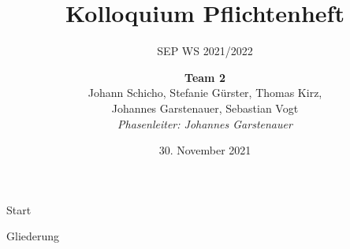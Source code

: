 \documentclass{beamer}
\title{Kolloquium Pflichtenheft}
\subtitle{SEP WS 2021/2022}
\date{\small 30. November 2021}
\author{\textbf{Team 2} \\ \small {Johann Schicho, Stefanie Gürster, Thomas Kirz,\\ Johannes Garstenauer, Sebastian Vogt} \\ \vspace{0.5cm}\emph{Phasenleiter: Johannes Garstenauer}\normalsize}
\begin{document}
    \begin{frame}{Start}
        \titlepage
    \end{frame}

    \begin{frame}{Gliederung}
        \tableofcontents
    \end{frame}


\end{document}
